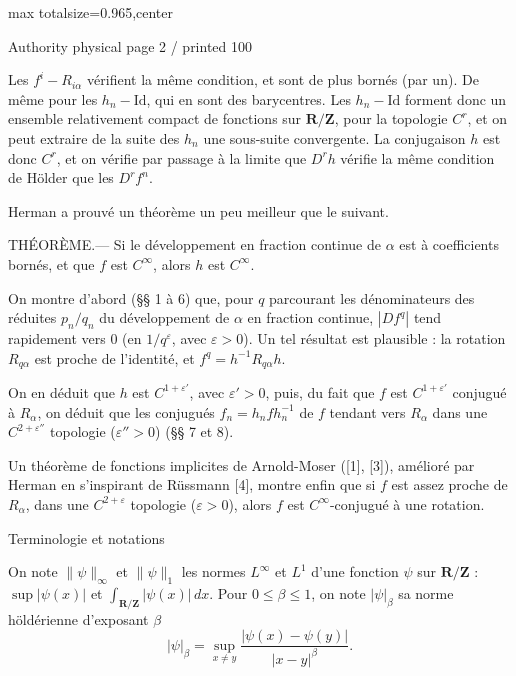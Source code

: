 \documentclass{article}
\begin{document}
\newpage
\noindent\begin{adjustbox}{max totalsize={\textwidth}{0.965\textheight},center}\begin{minipage}{\textwidth}
\noindent\hfill\scriptsize Authority physical page 2 / printed 100\par\normalsize
Les \(f^i-R_{i\alpha}\) vérifient la même condition, et sont de plus bornés (par un). De même pour les \(h_n-\mathrm{Id}\), qui en sont des barycentres. Les \(h_n-\mathrm{Id}\) forment donc un ensemble relativement compact de fonctions sur \(\mathbf R/\mathbf Z\), pour la topologie \(C^r\), et on peut extraire de la suite des \(h_n\) une sous-suite convergente. La conjugaison \(h\) est donc \(C^r\), et on vérifie par passage à la limite que \(D^rh\) vérifie la même condition de Hölder que les \(D^rf^n\).

Herman a prouvé un théorème un peu meilleur que le suivant.

THÉORÈME.— Si le développement en fraction continue de \(\alpha\) est à coefficients bornés, et que \(f\) est \(C^\infty\), alors \(h\) est \(C^\infty\).

On montre d’abord (§§ 1 à 6) que, pour \(q\) parcourant les dénominateurs des réduites \(p_n/q_n\) du développement de \(\alpha\) en fraction continue, \(|Df^q|\) tend rapidement vers \(0\) (en \(1/q^\varepsilon\), avec \(\varepsilon>0\)). Un tel résultat est plausible : la rotation \(R_{q\alpha}\) est proche de l’identité, et \(f^q=h^{-1}R_{q\alpha}h\).

On en déduit que \(h\) est \(C^{1+\varepsilon'}\), avec \(\varepsilon'>0\), puis, du fait que \(f\) est \(C^{1+\varepsilon'}\) conjugué à \(R_\alpha\), on déduit que les conjugués \(f_n=h_nfh_n^{-1}\) de \(f\) tendant vers \(R_\alpha\) dans une \(C^{2+\varepsilon''}\) topologie (\(\varepsilon''>0\)) (§§ 7 et 8).

Un théorème de fonctions implicites de Arnold-Moser ([1], [3]), amélioré par Herman en s’inspirant de Rüssmann [4], montre enfin que si \(f\) est assez proche de \(R_\alpha\), dans une \(C^{2+\varepsilon}\) topologie (\(\varepsilon>0\)), alors \(f\) est \(C^\infty\)-conjugué à une rotation.

Terminologie et notations

On note \(\|\psi\|_\infty\) et \(\|\psi\|_1\) les normes \(L^\infty\) et \(L^1\) d’une fonction \(\psi\) sur \(\mathbf R/\mathbf Z\) : \(\sup|\psi(x)|\) et \(\int_{\mathbf R/\mathbf Z}|\psi(x)|\,dx\). Pour \(0\leq\beta\leq1\), on note \(|\psi|_\beta\) sa norme höldérienne d’exposant \(\beta\)
\[
|\psi|_\beta=\sup_{x\neq y}\frac{|\psi(x)-\psi(y)|}{|x-y|^\beta}.
\]
\end{minipage}\end{adjustbox}
\end{document}
